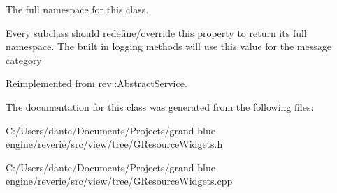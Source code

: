 The full namespace for this class. 

Every subclass should redefine/override this property to return its full namespace. The built in logging methods will use this value for the message category 

Reimplemented from \mbox{\hyperlink{classrev_1_1_abstract_service_a062e932eaa2eab0109288f2b32e459f7}{rev\+::\+Abstract\+Service}}.



The documentation for this class was generated from the following files\+:\begin{DoxyCompactItemize}
\item 
C\+:/\+Users/dante/\+Documents/\+Projects/grand-\/blue-\/engine/reverie/src/view/tree/G\+Resource\+Widgets.\+h\item 
C\+:/\+Users/dante/\+Documents/\+Projects/grand-\/blue-\/engine/reverie/src/view/tree/G\+Resource\+Widgets.\+cpp\end{DoxyCompactItemize}
